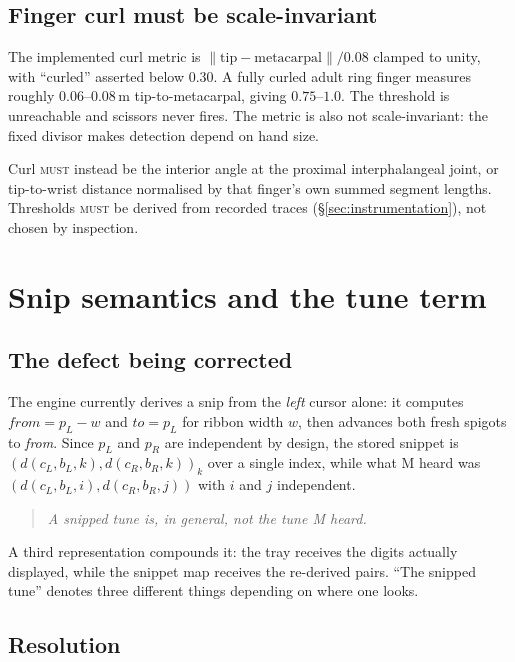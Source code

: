 \documentclass[11pt,a4paper]{article}
\newcommand{\MUST}{\textsc{must}}
\theoremstyle{definition}
\theoremstyle{plain}
\theoremstyle{remark}
\begin{document}
\subsection{Finger curl must be scale-invariant}

The implemented curl metric is $\lVert\text{tip}-\text{metacarpal}\rVert/0.08$ clamped to unity,
with ``curled'' asserted below $0.30$. A fully curled adult ring finger measures roughly
$0.06$--$0.08$\,m tip-to-metacarpal, giving $0.75$--$1.0$. The threshold is unreachable and scissors
never fires. The metric is also not scale-invariant: the fixed divisor makes detection depend on
hand size.

Curl \MUST{} instead be the interior angle at the proximal interphalangeal joint, or tip-to-wrist
distance normalised by that finger's own summed segment lengths. Thresholds \MUST{} be derived from
recorded traces (\S\ref{sec:instrumentation}), not chosen by inspection.

\section{Snip semantics and the tune term}
\label{sec:snip}

\subsection{The defect being corrected}

The engine currently derives a snip from the \emph{left} cursor alone: it computes
$\textit{from}=p_L-w$ and $\textit{to}=p_L$ for ribbon width $w$, then advances both fresh spigots
to \textit{from}. Since $p_L$ and $p_R$ are independent by design, the stored snippet is
$(d(c_L,b_L,k), d(c_R,b_R,k))_{k}$ over a single index, while what M heard was
$(d(c_L,b_L,i), d(c_R,b_R,j))$ with $i$ and $j$ independent.

\begin{quote}\itshape
A snipped tune is, in general, not the tune M heard.
\end{quote}

A third representation compounds it: the tray receives the digits actually displayed, while the
snippet map receives the re-derived pairs. ``The snipped tune'' denotes three different things
depending on where one looks.

\subsection{Resolution}
\end{document}
